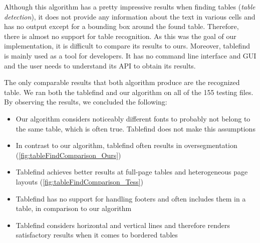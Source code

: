 Although this algorithm has a pretty impressive results when finding tables (\emph{table detection}), it does not provide any information about the text in various cells and has no output except for a bounding box around the found table. Therefore, there is almost no support for table recognition. As this was the goal of our implementation, it is difficult to compare its results to ours. Moreover, tablefind is mainly used as a tool for developers. It has no command line interface and GUI and the user needs to understand its API to obtain its results.

The only comparable results that both algorithm produce are the recognized table. We ran both the tablefind and our algorithm on all of the 155 testing files. By observing the results, we concluded the following:
\begin{itemize}
    \item Our algorithm considers noticeably different fonts to probably not belong to the same table, which is often true. Tablefind does not make this assumptions
    \item In contrast to our algorithm, tablefind often results in oversegmentation (\cref{fig:tableFindComparison_Ours})
    \item Tablefind achieves better results at full-page tables and heterogeneous page layouts (\cref{fig:tableFindComparison_Tess})
    \item Tablefind has no support for handling footers and often includes them in a table, in comparison to our algorithm
    \item Tablefind considers horizontal and vertical lines and therefore renders satisfactory results when it comes to bordered tables
\end{itemize}

